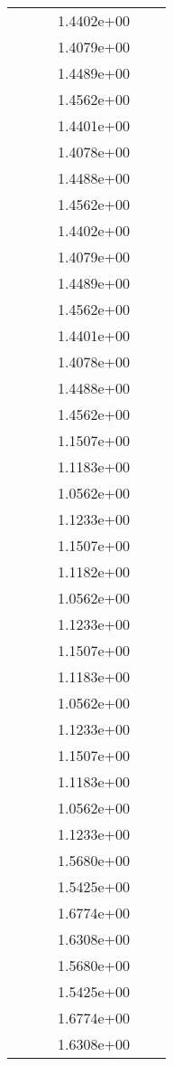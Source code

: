 \begin{xltabular}{\textwidth}{r|rS[table-format=1.3e+2]S[table-format=1.4e+2]S[table-format=1.4e+2]S[table-format=-1.5]}
&  &  & 1.4402e+00 & & \\
&  &  & 1.4079e+00 & & \\
&  &  & 1.4489e+00 & & \\
&  &  & 1.4562e+00 & & \\
&  &  & 1.4401e+00 & & \\
&  &  & 1.4078e+00 & & \\
&  &  & 1.4488e+00 & & \\
&  &  & 1.4562e+00 & & \\
&  &  & 1.4402e+00 & & \\
&  &  & 1.4079e+00 & & \\
&  &  & 1.4489e+00 & & \\
&  &  & 1.4562e+00 & & \\
&  &  & 1.4401e+00 & & \\
&  &  & 1.4078e+00 & & \\
&  &  & 1.4488e+00 & & \\
&  &  & 1.4562e+00 & & \\
&  &  & 1.1507e+00 & & \\
&  &  & 1.1183e+00 & & \\
&  &  & 1.0562e+00 & & \\
&  &  & 1.1233e+00 & & \\
&  &  & 1.1507e+00 & & \\
&  &  & 1.1182e+00 & & \\
&  &  & 1.0562e+00 & & \\
&  &  & 1.1233e+00 & & \\
&  &  & 1.1507e+00 & & \\
&  &  & 1.1183e+00 & & \\
&  &  & 1.0562e+00 & & \\
&  &  & 1.1233e+00 & & \\
&  &  & 1.1507e+00 & & \\
&  &  & 1.1183e+00 & & \\
&  &  & 1.0562e+00 & & \\
&  &  & 1.1233e+00 & & \\
&  &  & 1.5680e+00 & & \\
&  &  & 1.5425e+00 & & \\
&  &  & 1.6774e+00 & & \\
&  &  & 1.6308e+00 & & \\
&  &  & 1.5680e+00 & & \\
&  &  & 1.5425e+00 & & \\
&  &  & 1.6774e+00 & & \\
&  &  & 1.6308e+00 & & \\

\end{xltabular}
